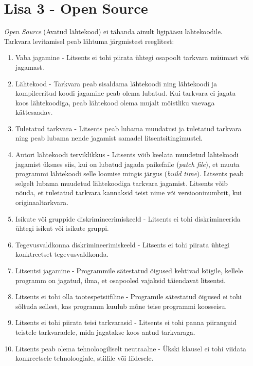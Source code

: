\documentclass[a4paper,12pt]{article} %
\begin{document}
\section*{Lisa 3 - Open Source}
\label{lisa3}
\textit{Open Source} (Avatud lähtekood) ei tähanda ainult ligipääsu lähtekoodile. Tarkvara levitamisel peab lähtuma järgmistest reeglitest:
\begin{enumerate}
\item Vaba jagamine - Litsents ei tohi piirata ühtegi osapoolt tarkvara müümast või jagamast.
\item Lähtekood -  Tarkvara peab sisaldama lähtekoodi ning lähtekoodi ja kompileeritud koodi jagamine peab olema lubatud. Kui tarkvara ei jagata koos lähtekoodiga, peab lähtekood olema mujalt mõistliku vaevaga kättesaadav.
\item Tuletatud tarkvara - Litsents peab lubama muudatusi ja tuletatud tarkvara ning peab lubama nende jagamist samadel litsentsitingimustel.
\item Autori lähtekoodi terviklikkus - Litsents võib keelata muudetud lähtekoodi jagamist üksnes siis, kui on lubatud jagada paikefaile (\textit{patch file}), et muuta programmi lähtekoodi selle loomise mingis järgus (\textit{build time}). Litsents peab selgelt lubama muudetud lähtekoodiga tarkvara jagamist. Litsents võib nõuda, et tuletatud tarkvara kannaksid teist nime või versiooninumbrit, kui originaaltarkvara.
\item Isikute või gruppide diskrimineerimiskeeld - Litsents ei tohi diskrimineerida ühtegi isikut või isikute gruppi.
\item Tegevusvaldkonna diskrimineerimiskeeld - Litsents ei tohi piirata ühtegi konktreetset tegevusvaldkonda.
\item Litsentsi jagamine - Programmile sätestatud õigused kehtivad kõigile, kellele programm on jagatud, ilma, et osapooled vajaksid täiendavat litsentsi.
\item Litsents ei tohi olla tootespetsiifiline - Programile sätestatud õigused ei tohi sõltuda sellest, kas programm kuulub mõne teise programmi koosseisu.
\item Litsents ei tohi piirata teisi tarkvarasid - Litsents ei tohi panna piiranguid teistele tarkvaradele, mida jagatakse koos antud tarkvaraga.
\item Litsents peab olema tehnoloogiliselt neutraalne - Ükski klausel ei tohi viidata konkreetsele tehnoloogiale, stiilile või liidesele.
\end{enumerate}
\cite{Open_Source_Def}
\end{document}
